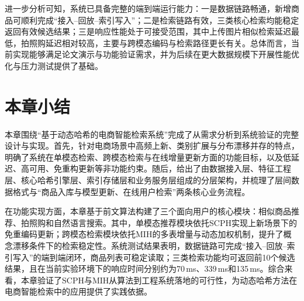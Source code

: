 进一步分析可知，系统已具备完整的端到端运行能力：一是数据链路畅通，新增商品可顺利完成“接入--回放--索引写入”；二是检索链路有效，三类核心检索均能稳定返回有效候选结果；三是响应性能处于可接受范围，其中上传图片相似检索延迟最低，拍照购延迟相对较高，主要与跨模态编码与检索路径更长有关。总体而言，当前实现能够满足论文演示与功能验证需求，并为后续在更大数据规模下开展性能优化与压力测试提供了基础。

\section{本章小结}
本章围绕“基于动态哈希的电商智能检索系统”完成了从需求分析到系统验证的完整设计与实现。首先，针对电商场景中高频上新、类别扩展与分布漂移并存的特点，明确了系统在单模态检索、跨模态检索与在线增量更新方面的功能目标，以及低延迟、高可用、免重构更新等非功能约束。随后，给出了由数据接入层、特征工程层、核心哈希引擎层、索引存储层和业务服务层组成的分层架构，并梳理了层间数据格式与“商品入库与模型更新、在线用户检索”两条核心业务流程。

在功能实现方面，本章基于前文算法构建了三个面向用户的核心模块：相似商品推荐、拍照购和自然语言搜索。其中，单模态推荐模块依托SCPH实现上新场景下的免重编码更新；跨模态检索模块依托MIH的多表增量与动态加权机制，提升了概念漂移条件下的检索稳定性。系统测试结果表明，数据链路可完成“接入--回放--索引写入”的端到端闭环，商品列表可稳定读取；三类检索功能均可返回前10个候选结果，且在当前实验环境下的响应时间分别约为70\,ms、339\,ms和135\,ms。综合来看，本章验证了SCPH与MIH从算法到工程系统落地的可行性，为动态哈希方法在电商智能检索中的应用提供了实践依据。
